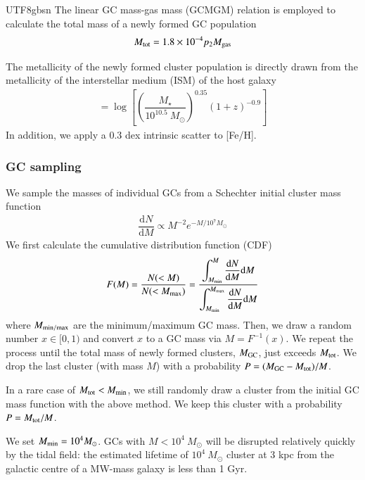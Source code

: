 \documentclass[trackchanges, twocolappendix, twocolumn]{aastex701}
\begin{document}
\begin{CJK*}{UTF8}{gbsn}
The linear GC mass-gas mass (GCMGM) relation is employed to calculate the total mass of a newly formed GC population
\begin{align}
M_{\rm tot} = 1.8 \times 10^{-4} p_2 M_{\rm gas} 
\end{align}

The metallicity of the newly formed cluster population is directly drawn from the metallicity of the interstellar medium (ISM) of the host galaxy
\begin{align}
[\mathrm{Fe/H}] = \log \left[ \left( \dfrac{M_\star}{10^{10.5}~M_\odot} \right)^{0.35} (1 + z)^{-0.9} \right]
\end{align}
In addition, we apply a 0.3 dex intrinsic scatter to [Fe/H].

\subsubsection{GC sampling} \label{subsubsect:sample}

We sample the masses of individual GCs from a Schechter initial cluster mass function
\begin{align}
\dfrac{\mathrm{d} N}{\mathrm{d} M} \propto M^{-2} e^{- M / 10^7M_\odot}
\label{eq:Schechter}
\end{align}
We first calculate the cumulative distribution function (CDF)
\begin{align}
F (M) = \dfrac{N (< M)}{N (< M_{\rm max})} = \dfrac{\displaystyle \int_{M_{\rm min}}^{M} \dfrac{\mathrm{d} N}{\mathrm{d} M} \mathrm{d} M}{\displaystyle \int_{M_{\rm min}}^{M_{\rm max}} \dfrac{\mathrm{d} N}{\mathrm{d} M} \mathrm{d} M}
\label{eq:CDF}
\end{align}
where $M_{\rm min/max}$ are the minimum/maximum GC mass. Then, we draw a random number $x \in [0,1)$ and convert $x$ to a GC mass via $M = F^{-1} (x)$. We repeat the process until the total mass of newly formed clusters, $M_{\rm GC}$, just exceeds $M_{\rm tot}$. We drop the last cluster (with mass $M$) with a probability $P = (M_{\rm GC} - M_{\rm tot}) / M$.

In a rare case of $M_{\rm tot}<M_{\rm min}$, we still randomly draw a cluster from the initial GC mass function with the above method. We keep this cluster with a probability $P = M_{\rm tot} / M$.

We set $M_{\rm min} = 10^4M_\odot$. GCs with $M < 10^4~M_\odot$ will be disrupted relatively quickly by the tidal field: the estimated lifetime of $10^4~M_\odot$ cluster at 3 kpc from the galactic centre of a MW-mass galaxy is less than 1 Gyr.


\end{CJK*}
\end{document}
